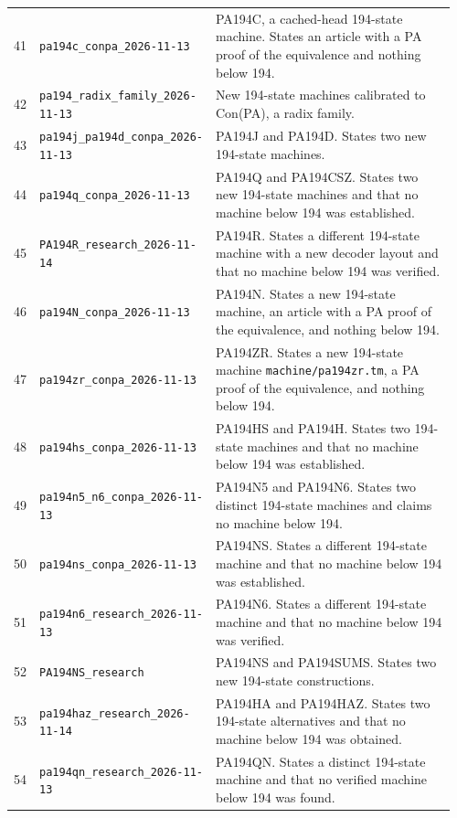 \begin{longtable}{@{}p{0.035\linewidth}p{0.325\linewidth}p{0.60\linewidth}@{}}
41 & \nolinkurl{pa194c_conpa_2026-11-13} & PA194C, a cached-head 194-state machine. States an article with a PA proof of the equivalence and nothing below 194.\\[5pt]
42 & \nolinkurl{pa194_radix_family_2026-11-13} & New 194-state machines calibrated to Con(PA), a radix family.\\[5pt]
43 & \nolinkurl{pa194j_pa194d_conpa_2026-11-13} & PA194J and PA194D. States two new 194-state machines.\\[5pt]
44 & \nolinkurl{pa194q_conpa_2026-11-13} & PA194Q and PA194CSZ. States two new 194-state machines and that no machine below 194 was established.\\[5pt]
45 & \nolinkurl{PA194R_research_2026-11-14} & PA194R. States a different 194-state machine with a new decoder layout and that no machine below 194 was verified.\\[5pt]
46 & \nolinkurl{pa194N_conpa_2026-11-13} & PA194N. States a new 194-state machine, an article with a PA proof of the equivalence, and nothing below 194.\\[5pt]
47 & \nolinkurl{pa194zr_conpa_2026-11-13} & PA194ZR. States a new 194-state machine \nolinkurl{machine/pa194zr.tm}, a PA proof of the equivalence, and nothing below 194.\\[5pt]
48 & \nolinkurl{pa194hs_conpa_2026-11-13} & PA194HS and PA194H. States two 194-state machines and that no machine below 194 was established.\\[5pt]
49 & \nolinkurl{pa194n5_n6_conpa_2026-11-13} & PA194N5 and PA194N6. States two distinct 194-state machines and claims no machine below 194.\\[5pt]
50 & \nolinkurl{pa194ns_conpa_2026-11-13} & PA194NS. States a different 194-state machine and that no machine below 194 was established.\\[5pt]
51 & \nolinkurl{pa194n6_research_2026-11-13} & PA194N6. States a different 194-state machine and that no machine below 194 was verified.\\[5pt]
52 & \nolinkurl{PA194NS_research} & PA194NS and PA194SUMS. States two new 194-state constructions.\\[5pt]
53 & \nolinkurl{pa194haz_research_2026-11-14} & PA194HA and PA194HAZ. States two 194-state alternatives and that no machine below 194 was obtained.\\[5pt]
54 & \nolinkurl{pa194qn_research_2026-11-13} & PA194QN. States a distinct 194-state machine and that no verified machine below 194 was found.\\[5pt]

\end{longtable}
